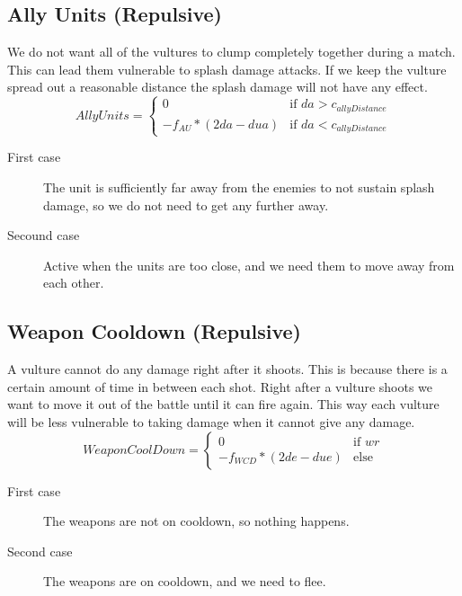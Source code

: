 	\subsection{Ally Units (Repulsive)}
We do not want all of the vultures to clump completely together during a match. This can lead them vulnerable to splash damage attacks. If we keep the vulture spread out a reasonable distance the splash damage will not have any effect.
		\begin{displaymath}
			AllyUnits = \begin{cases}
					0 & \text{if } da > c_{allyDistance}\\
					-f_{AU} * (2da - dua) & \text{if } da < c_{allyDistance}
				\end{cases}		
		\end{displaymath}
	\begin{description}	
		\item[First case] The unit is sufficiently far away from the enemies to not sustain splash damage, so we do not need to get any further away.
		\item[Secound case] Active when the units are too close, and we need them to move away from each other.
	\end{description}
	\subsection{Weapon Cooldown (Repulsive)}
A vulture cannot do any damage right after it shoots. This is because there is a certain amount of time in between each shot. Right after a vulture shoots we want to move it out of the battle until it can fire again. This way each vulture will be less vulnerable to taking damage when it cannot give any damage.
		\begin{displaymath}
			WeaponCoolDown = \begin{cases}
					0 & \text{if } wr\\
					-f_{WCD} * (2de - due) & \text{else}
				\end{cases}		
		\end{displaymath}

	\begin{description}	
		\item[First case] The weapons are not on cooldown, so nothing happens. 
		\item[Second case] The weapons are on cooldown, and we need to flee.        
    \end{description}	
